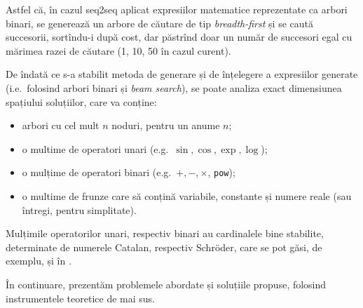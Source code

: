 Astfel că, în cazul seq2seq aplicat expresiilor matematice reprezentate
ca arbori binari, se generează un arbore de căutare de tip \emph{breadth-first}
și se caută succesorii, sortîndu-i după cost, dar păstrînd doar un
număr de succesori egal cu mărimea razei de căutare (1, 10, 50 în
cazul curent).

De îndată ce s-a stabilit metoda de generare și de înțelegere a expresiilor
generate (i.e.\ folosind arbori binari și \emph{beam search}), se poate analiza exact
dimensiunea spațiului soluțiilor, care va conține:
\begin{itemize}
    \item arbori cu cel mult $ n $ noduri, pentru un anume $ n $;
    \item o multime de operatori unari (e.g.\ $ \sin, \cos, \exp, \log $);
    \item o mulțime de operatori binari (e.g.\ $ +, -, \times $, \texttt{pow});
    \item o multime de frunze care să conțină variabile, constante și numere
        reale (sau întregi, pentru simplitate).
\end{itemize}

Mulțimile operatorilor unari, respectiv binari au cardinalele bine stabilite,
determinate de numerele Catalan, respectiv Schr\"{o}der, care se pot găsi,
de exemplu, și în \cite{sloane}.

În continuare, prezentăm problemele abordate și soluțiile propuse, folosind
instrumentele teoretice de mai sus.
